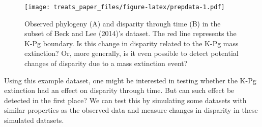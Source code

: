 \documentclass[
]{article}
\newenvironment{Shaded}{\begin{snugshade}}{\end{snugshade}}
\newcommand{\CommentTok}[1]{\textcolor[rgb]{0.56,0.35,0.01}{\textit{#1}}}
\newcommand{\DataTypeTok}[1]{\textcolor[rgb]{0.13,0.29,0.53}{#1}}
\newcommand{\DecValTok}[1]{\textcolor[rgb]{0.00,0.00,0.81}{#1}}
\newcommand{\KeywordTok}[1]{\textcolor[rgb]{0.13,0.29,0.53}{\textbf{#1}}}
\newcommand{\NormalTok}[1]{#1}
\newcommand{\OperatorTok}[1]{\textcolor[rgb]{0.81,0.36,0.00}{\textbf{#1}}}
\newcommand{\OtherTok}[1]{\textcolor[rgb]{0.56,0.35,0.01}{#1}}
\newcommand{\StringTok}[1]{\textcolor[rgb]{0.31,0.60,0.02}{#1}}
\begin{document}
\begin{Shaded}
\end{Shaded}

\begin{figure}
\centering
\texttt{[image: treats\_paper\_files/figure-latex/prepdata-1.pdf]}
\caption{Observed phylogeny (A) and disparity through time (B) in the
subset of Beck and Lee (2014)'s dataset. The red line represents the
K-Pg boundary. Is this change in disparity related to the K-Pg mass
extinction? Or, more generally, is it even possible to detect potential
changes of disparity due to a mass extinction event?}
\end{figure}

Using this example dataset, one might be interested in testing whether
the K-Pg extinction had an effect on disparity through time. But can
such effect be detected in the first place? We can test this by
simulating some datasets with similar properties as the observed data
and measure changes in disparity in these simulated datasets.
\end{document}
